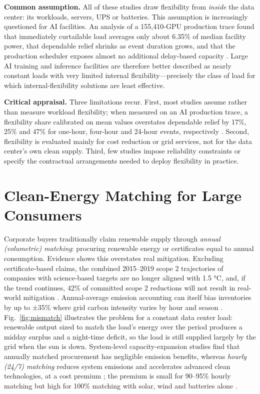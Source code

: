 \textbf{Common assumption.} All of these studies draw flexibility from \emph{inside} the data center: its workloads, servers, UPS or batteries. This assumption is increasingly questioned for AI facilities. An analysis of a 155,410-GPU production trace found that immediately curtailable load averages only about 6.35\% of median facility power, that dependable relief shrinks as event duration grows, and that the production scheduler exposes almost no additional delay-based capacity \cite{r26}. Large AI training and inference facilities are therefore better described as nearly constant loads with very limited internal flexibility---precisely the class of load for which internal-flexibility solutions are least effective.

\textbf{Critical appraisal.} Three limitations recur. First, most studies assume rather than measure workload flexibility; when measured on an AI production trace, a flexibility share calibrated on mean values overstates dependable relief by 17\%, 25\% and 47\% for one-hour, four-hour and 24-hour events, respectively \cite{r26}. Second, flexibility is evaluated mainly for cost reduction or grid services, not for the data center's own clean supply. Third, few studies impose reliability constraints or specify the contractual arrangements needed to deploy flexibility in practice.

\section{Clean-Energy Matching for Large Consumers}\label{sec:2-7}

Corporate buyers traditionally claim renewable supply through \emph{annual (volumetric) matching}: procuring renewable energy or certificates equal to annual consumption. Evidence shows this overstates real mitigation. Excluding certificate-based claims, the combined 2015--2019 scope 2 trajectories of companies with science-based targets are no longer aligned with 1.5 °C, and, if the trend continues, 42\% of committed scope 2 reductions will not result in real-world mitigation \cite{r12}. Annual-average emission accounting can itself bias inventories by up to ±35\% where grid carbon intensity varies by hour and season \cite{r13}. Fig.~\ref{fig:mismatch} illustrates the problem for a constant data center load: renewable output sized to match the load's energy over the period produces a midday surplus and a night-time deficit, so the load is still supplied largely by the grid when the sun is down. System-level capacity-expansion studies find that annually matched procurement has negligible emission benefits, whereas \emph{hourly (24/7) matching} reduces system emissions and accelerates advanced clean technologies, at a cost premium \cite{r10,r11}; the premium is small for 90--95\% hourly matching but high for 100\% matching with solar, wind and batteries alone \cite{r11}.


